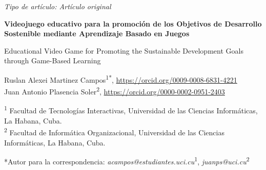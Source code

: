\documentclass[12pt,a4paper]{article}
\begin{document}
\begin{flushleft}
\textit{Tipo de artículo: Artículo original}
\end{flushleft}

\vspace{0.5cm}

\begin{center}
{\sffamily\bfseries\Large Videojuego educativo para la promoción de los Objetivos de Desarrollo Sostenible mediante Aprendizaje Basado en Juegos}
\end{center}

\vspace{0.3cm}

\begin{center}
{\sffamily\Large Educational Video Game for Promoting the Sustainable Development Goals through Game-Based Learning}
\end{center}

\vspace{0.5cm}

\begin{flushleft}
Ruslan Alexei Martinez Campos\textsuperscript{1*}, \href{https://orcid.org/0009-0008-6831-4221}{https://orcid.org/0009-0008-6831-4221}\\
Juan Antonio Plasencia Soler\textsuperscript{2}, \href{https://orcid.org/0000-0002-0951-2403}{https://orcid.org/0000-0002-0951-2403}
\end{flushleft}

\vspace{0.3cm}

\begin{flushleft}
\textsuperscript{1} Facultad de Tecnologías Interactivas, Universidad de las Ciencias Informáticas, La Habana, Cuba.\\
\textsuperscript{2} Facultad de Informática Organizacional, Universidad de las Ciencias Informáticas, La Habana, Cuba.
\end{flushleft}

\vspace{0.1cm}

\begin{flushleft}
*Autor para la correspondencia: \textit{acampos@estudiantes.uci.cu}\textsuperscript{1}, \textit{juanps@uci.cu}\textsuperscript{2}
\end{flushleft}
\end{document}
